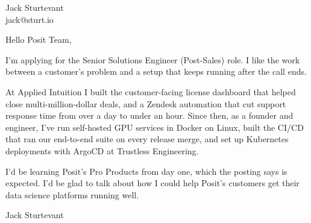 \documentclass[11pt]{article}
\begin{document}
\raggedright

{\namefont\fontsize{20pt}{24pt}\selectfont Jack Sturtevant}\\[-0.3em]
jack@sturt.io

\vspace{1.2em}

Hello Posit Team,

I'm applying for the Senior Solutions Engineer (Post-Sales) role. I like the work between a customer's problem and a setup that keeps running after the call ends.

At Applied Intuition I built the customer-facing license dashboard that helped close multi-million-dollar deals, and a Zendesk automation that cut support response time from over a day to under an hour. Since then, as a founder and engineer, I've run self-hosted GPU services in Docker on Linux, built the CI/CD that ran our end-to-end suite on every release merge, and set up Kubernetes deployments with ArgoCD at Trustless Engineering.

I'd be learning Posit's Pro Products from day one, which the posting says is expected. I'd be glad to talk about how I could help Posit's customers get their data science platforms running well.

\vspace{0.6em}
Jack Sturtevant
\end{document}
